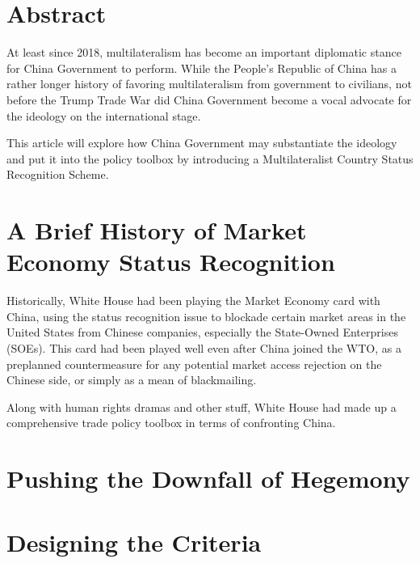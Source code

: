 
\usepackage{multicol}




\section*{Abstract}

At least since 2018, multilateralism has become an important diplomatic stance for China Government to perform. While the People's Republic of China has a rather longer history of favoring multilateralism from government to civilians, not before the Trump Trade War did China Government become a vocal advocate for the ideology on the international stage.

This article will explore how China Government may substantiate the ideology and put it into the policy toolbox by introducing a Multilateralist Country Status Recognition Scheme.

\maketoc{\small}{}

\section{A Brief History of Market Economy Status Recognition}
Historically, White House had been playing the Market Economy card with China, using the status recognition issue to blockade certain market areas in the United States from Chinese companies, especially the State-Owned Enterprises (SOEs). This card had been played well even after China joined the WTO, as a preplanned countermeasure for any potential market access rejection on the Chinese side, or simply as a mean of blackmailing.

Along with human rights dramas and other stuff, White House had made up a comprehensive trade policy toolbox in terms of confronting China.

\section{Pushing the Downfall of Hegemony}
\section{Designing the Criteria}
